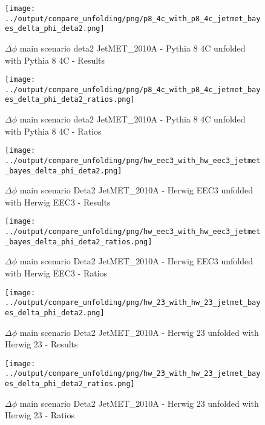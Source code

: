 \documentclass[11pt]{book}
\begin{document}
\begin{figure}[ht]
\centering
\texttt{[image: ../output/compare\_unfolding/png/p8\_4c\_with\_p8\_4c\_jetmet\_bayes\_delta\_phi\_deta2.png]}
\caption{$\Delta\phi$ main scenario deta2 JetMET\_2010A - Pythia 8 4C unfolded with Pythia 8 4C - Results}
\label{p8_p8_jetmet_bayes_delta_phi_deta2_a}
\end{figure}

\begin{figure}[ht]
\centering
\texttt{[image: ../output/compare\_unfolding/png/p8\_4c\_with\_p8\_4c\_jetmet\_bayes\_delta\_phi\_deta2\_ratios.png]}
\caption{$\Delta\phi$ main scenario deta2 JetMET\_2010A - Pythia 8 4C unfolded with Pythia 8 4C - Ratios}
\label{p8_p8_jetmet_bayes_delta_phi_deta2_b}
\end{figure}

\begin{figure}[ht]
\centering
\texttt{[image: ../output/compare\_unfolding/png/hw\_eec3\_with\_hw\_eec3\_jetmet\_bayes\_delta\_phi\_deta2.png]}
\caption{$\Delta\phi$ main scenario Deta2 JetMET\_2010A - Herwig EEC3 unfolded with Herwig EEC3 - Results}
\label{hw_eec3_hw_eec3_jetmet_bayes_delta_phi_deta2_a}
\end{figure}

\begin{figure}[ht]
\centering
\texttt{[image: ../output/compare\_unfolding/png/hw\_eec3\_with\_hw\_eec3\_jetmet\_bayes\_delta\_phi\_deta2\_ratios.png]}
\caption{$\Delta\phi$ main scenario Deta2 JetMET\_2010A - Herwig EEC3 unfolded with Herwig EEC3 - Ratios}
\label{hw_eec3_hw_eec3_jetmet_bayes_delta_phi_deta2_b}
\end{figure}

\begin{figure}[ht]
\centering
\texttt{[image: ../output/compare\_unfolding/png/hw\_23\_with\_hw\_23\_jetmet\_bayes\_delta\_phi\_deta2.png]}
\caption{$\Delta\phi$ main scenario Deta2 JetMET\_2010A - Herwig 23 unfolded with Herwig 23 - Results}
\label{hw_23_hw_23_jetmet_bayes_delta_phi_deta2_a}
\end{figure}

\begin{figure}[ht]
\centering
\texttt{[image: ../output/compare\_unfolding/png/hw\_23\_with\_hw\_23\_jetmet\_bayes\_delta\_phi\_deta2\_ratios.png]}
\caption{$\Delta\phi$ main scenario Deta2 JetMET\_2010A - Herwig 23 unfolded with Herwig 23 - Ratios}
\label{hw_23_hw_23_jetmet_bayes_delta_phi_deta2_b}
\end{figure}
\end{document}
